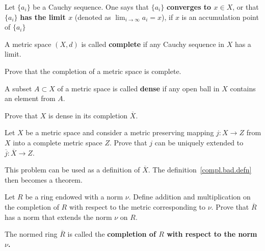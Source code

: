 \documentclass[12pt]{article}
\begin{document}
\begin{opredelenie} Let $\{a_i\}$ be a Cauchy sequence. One says
  that $\{a_i\}$ {\bf converges to $x\in X$}, or that $\{a_i\}$ {\bf 
has the limit $x$} (denoted as $\lim_{i\to \infty} a_i =x$), if $x$
is an accumulation point of $\{a_i\}$
\end{opredelenie}

\begin{opredelenie}
A metric space $(X,d)$ is called {\bf complete} if any Cauchy sequence
in $X$ has a limit.
\end{opredelenie}

\begin{zadacha}[!] Prove that the completion of a metric space is complete.
\end{zadacha}

\begin{opredelenie} A subset $A \subset X$ of a metric space 
is called {\bf dense} if any open ball in $X$ contains an element from
$A$. 
\end{opredelenie}

\begin{zadacha} Prove that $X$ is dense in its completion $\overline{X}$.
\end{zadacha}

\begin{zadacha}[*]
  Let $X$ be a metric space and consider a metric preserving mapping
  $j: X \to Z$ from $X$ into a complete metric space $Z$. Prove that $j$
  can be uniquely extended to $\overline{j}:\overline{X} \to Z$.
\end{zadacha}

\begin{zamechanie}
This problem can be used as a definition of 
$\overline{X}$. The definition~\ref{compl.bad.defn} then becomes a
theorem. 
\end{zamechanie}

\begin{zadacha}[!] Let $R$ be a ring endowed with a norm $\nu$.
  Define addition and multiplication on the completion of $R$ with
  respect to the metric corresponding to $\nu$. Prove that
  $\overline{R}$ has a norm that extends the norm $\nu$ on $R$.
\end{zadacha}

\begin{opredelenie} The normed ring $\overline{R}$ is called the 
{\bf completion of $R$ with respect to the norm $\nu$.}
\end{opredelenie}
\end{document}
